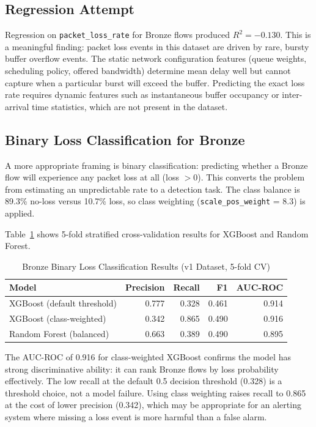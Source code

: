 \documentclass[a4paper,12pt]{Classes/RoboticsLaTeX}
\begin{document}
\subsection{Regression Attempt}

Regression on \texttt{packet\_loss\_rate} for Bronze flows produced $R^2 = -0.130$. This is a meaningful finding: packet loss events in this dataset are driven by rare, bursty buffer overflow events. The static network configuration features (queue weights, scheduling policy, offered bandwidth) determine mean delay well but cannot capture when a particular burst will exceed the buffer. Predicting the exact loss rate requires dynamic features such as instantaneous buffer occupancy or inter-arrival time statistics, which are not present in the dataset.

\subsection{Binary Loss Classification for Bronze}

A more appropriate framing is binary classification: predicting whether a Bronze flow will experience any packet loss at all (loss $> 0$). This converts the problem from estimating an unpredictable rate to a detection task. The class balance is 89.3\% no-loss versus 10.7\% loss, so class weighting (\texttt{scale\_pos\_weight} = 8.3) is applied.

Table~\ref{tab:bronze_loss_clf} shows 5-fold stratified cross-validation results for XGBoost and Random Forest.

\begin{table}[H]
\centering
\caption{Bronze Binary Loss Classification Results (v1 Dataset, 5-fold CV)}
\label{tab:bronze_loss_clf}
\begin{tabular}{|l|r|r|r|r|}
\hline
\textbf{Model} & \textbf{Precision} & \textbf{Recall} & \textbf{F1} & \textbf{AUC-ROC} \\
\hline
XGBoost (default threshold) & 0.777 & 0.328 & 0.461 & 0.914 \\
\hline
XGBoost (class-weighted)    & 0.342 & 0.865 & 0.490 & 0.916 \\
\hline
Random Forest (balanced)    & 0.663 & 0.389 & 0.490 & 0.895 \\
\hline
\end{tabular}
\end{table}

The AUC-ROC of 0.916 for class-weighted XGBoost confirms the model has strong discriminative ability: it can rank Bronze flows by loss probability effectively. The low recall at the default 0.5 decision threshold (0.328) is a threshold choice, not a model failure. Using class weighting raises recall to 0.865 at the cost of lower precision (0.342), which may be appropriate for an alerting system where missing a loss event is more harmful than a false alarm.
\end{document}
